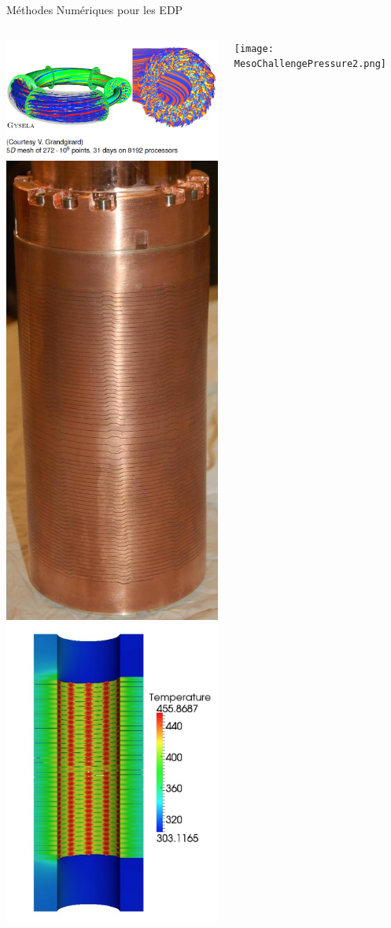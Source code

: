 \documentclass{beamer}
\begin{document}
\begin{frame}{Méthodes Numériques pour les EDP}


  \begin{columns}
    \includegraphics[width=0.9\linewidth]{gysela.png}\\
    \includegraphics[width=0.4\linewidth]{Radial_magnet.jpg}
    \includegraphics[width=0.4\linewidth]{temperature.jpg}
    \centerline{\texttt{[image: MesoChallengePressure2.png]}}\\
  \end{columns}




\end{frame}
\end{document}
